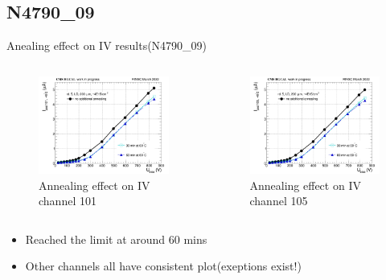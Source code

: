 \documentclass{beamer}
\begin{document}
\subsection{N4790\_09}

\begin{frame}{Anealing effect on IV results(N4790\_09) }
  \begin{columns}
       \begin{figure}
           \includegraphics[width=1.0\textwidth]{plots/8in_198ch_2019_N4790_09_4E15_neg40degC_annealing_IV_ch101.png}
           \caption{Annealing effect on IV channel 101 }
       \end{figure}
       \begin{figure}
           \includegraphics[width=1.0\textwidth]{plots/8in_198ch_2019_N4790_09_4E15_neg40degC_annealing_IV_ch105.png}
           \caption{Annealing effect on IV channel 105}
       \end{figure}
   \end{columns}
   \begin{itemize}
      \item Reached the limit at around 60 mins
      \item Other channels all have consistent plot(exeptions exist!)
   \end{itemize}
\end{frame}
\end{document}

